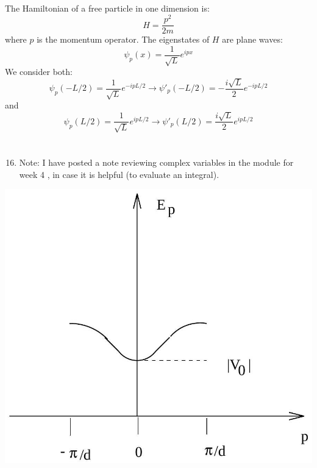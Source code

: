 \documentclass[12pt]{article}
\begin{document}
\subsection{}
The Hamiltonian of a free particle in one dimension is:
\begin{equation}
  H=\frac{p^{2}}{2 m}
\end{equation}
where $p$ is the momentum operator. The eigenstates of $H$ are plane waves:
\begin{equation}
  \psi_{p}(x)=\frac{1}{\sqrt{L}} e^{i p x}
\end{equation}
We consider both:
\begin{equation}
  \psi_{p}(-L / 2)=\frac{1}{\sqrt{L}} e^{-i p L / 2} \rightarrow \psi'_{p}(-L / 2)=-\frac{i \sqrt{L}}{2} e^{-i p L / 2}
\end{equation}
and
\begin{equation}
  \psi_{p}(L / 2)=\frac{1}{\sqrt{L}} e^{i p L / 2} \rightarrow \psi'_{p}(L / 2)=\frac{i \sqrt{L}}{2} e^{i p L / 2}
\end{equation}

\section{}
\begin{enumerate}
  \setcounter{enumi}{15}
  \item Note: I have posted a note reviewing complex variables in the module for week 4 , in case it is helpful (to evaluate an integral).
\end{enumerate}

\begin{center}
\includegraphics[max width=\textwidth]{2024_01_29_bd91e6d395035e9decbag-3}
\end{center}
\end{document}
